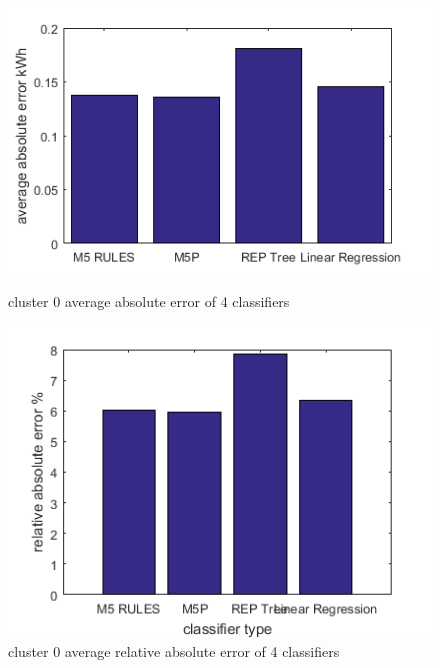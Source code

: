\begin{figure}
\centering
\begin{minipage}{.5\textwidth}
  \centering
  \includegraphics[width=\linewidth]{cluster-0-diff-classifier-avg-abs.png}
  \caption{cluster 0 average absolute error of 4 classifiers}
  \label{fig:cluster-0-predictors}
\end{minipage}%
\begin{minipage}{.5\textwidth}
  \centering
  \includegraphics[width=\linewidth]{cluster-0-diff-classifier-relative-abs.png}
  \caption{cluster 0 average relative absolute error of 4 classifiers}
\end{minipage}


\end{figure}
